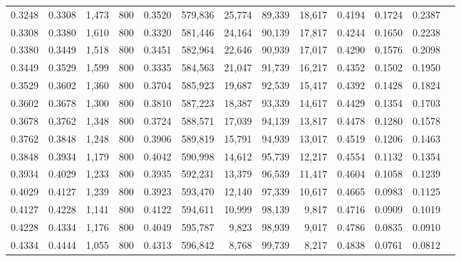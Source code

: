 \begin{tabular}{rrrrrrrrrrrrr}
0.3248 & 0.3308 &  1,473 & 800 &                                     0.3520 & 579,836 &  25,774 &  89,339 &  18,617 & 0.4194 & 0.1724 & 0.2387 \\
0.3308 & 0.3380 &  1,610 & 800 &                                     0.3320 & 581,446 &  24,164 &  90,139 &  17,817 & 0.4244 & 0.1650 & 0.2238 \\
0.3380 & 0.3449 &  1,518 & 800 &                                     0.3451 & 582,964 &  22,646 &  90,939 &  17,017 & 0.4290 & 0.1576 & 0.2098 \\
0.3449 & 0.3529 &  1,599 & 800 &                                     0.3335 & 584,563 &  21,047 &  91,739 &  16,217 & 0.4352 & 0.1502 & 0.1950 \\
0.3529 & 0.3602 &  1,360 & 800 &                                     0.3704 & 585,923 &  19,687 &  92,539 &  15,417 & 0.4392 & 0.1428 & 0.1824 \\
0.3602 & 0.3678 &  1,300 & 800 &                                     0.3810 & 587,223 &  18,387 &  93,339 &  14,617 & 0.4429 & 0.1354 & 0.1703 \\
0.3678 & 0.3762 &  1,348 & 800 &                                     0.3724 & 588,571 &  17,039 &  94,139 &  13,817 & 0.4478 & 0.1280 & 0.1578 \\
0.3762 & 0.3848 &  1,248 & 800 &                                     0.3906 & 589,819 &  15,791 &  94,939 &  13,017 & 0.4519 & 0.1206 & 0.1463 \\
0.3848 & 0.3934 &  1,179 & 800 &                                     0.4042 & 590,998 &  14,612 &  95,739 &  12,217 & 0.4554 & 0.1132 & 0.1354 \\
0.3934 & 0.4029 &  1,233 & 800 &                                     0.3935 & 592,231 &  13,379 &  96,539 &  11,417 & 0.4604 & 0.1058 & 0.1239 \\
0.4029 & 0.4127 &  1,239 & 800 &                                     0.3923 & 593,470 &  12,140 &  97,339 &  10,617 & 0.4665 & 0.0983 & 0.1125 \\
0.4127 & 0.4228 &  1,141 & 800 &                                     0.4122 & 594,611 &  10,999 &  98,139 &   9,817 & 0.4716 & 0.0909 & 0.1019 \\
0.4228 & 0.4334 &  1,176 & 800 &                                     0.4049 & 595,787 &   9,823 &  98,939 &   9,017 & 0.4786 & 0.0835 & 0.0910 \\
0.4334 & 0.4444 &  1,055 & 800 &                                     0.4313 & 596,842 &   8,768 &  99,739 &   8,217 & 0.4838 & 0.0761 & 0.0812 \\

\end{tabular}
